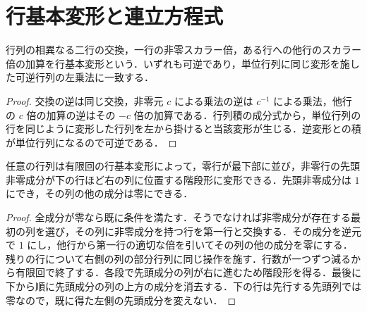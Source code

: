 \section{行基本変形と連立方程式}
\begin{prop}[行基本変形の可逆性]
行列の相異なる二行の交換，一行の非零スカラー倍，ある行への他行のスカラー倍の加算を行基本変形という．いずれも可逆であり，単位行列に同じ変形を施した可逆行列の左乗法に一致する．
\end{prop}
\begin{proof}
交換の逆は同じ交換，非零元 $c$ による乗法の逆は $c^{-1}$ による乗法，他行の $c$ 倍の加算の逆はその $-c$ 倍の加算である．行列積の成分式から，単位行列の行を同じように変形した行列を左から掛けると当該変形が生じる．逆変形との積が単位行列になるので可逆である．
\end{proof}
\begin{prop}[行基本変形による階段形への変形]
任意の行列は有限回の行基本変形によって，零行が最下部に並び，非零行の先頭非零成分が下の行ほど右の列に位置する階段形に変形できる．先頭非零成分は $1$ にでき，その列の他の成分は零にできる．
\end{prop}
\begin{proof}
全成分が零なら既に条件を満たす．そうでなければ非零成分が存在する最初の列を選び，その列に非零成分を持つ行を第一行と交換する．その成分を逆元で $1$ にし，他行から第一行の適切な倍を引いてその列の他の成分を零にする．残りの行について右側の列の部分行列に同じ操作を施す．行数が一つずつ減るから有限回で終了する．各段で先頭成分の列が右に進むため階段形を得る．最後に下から順に先頭成分の列の上方の成分を消去する．下の行は先行する先頭列では零なので，既に得た左側の先頭成分を変えない．
\end{proof}
